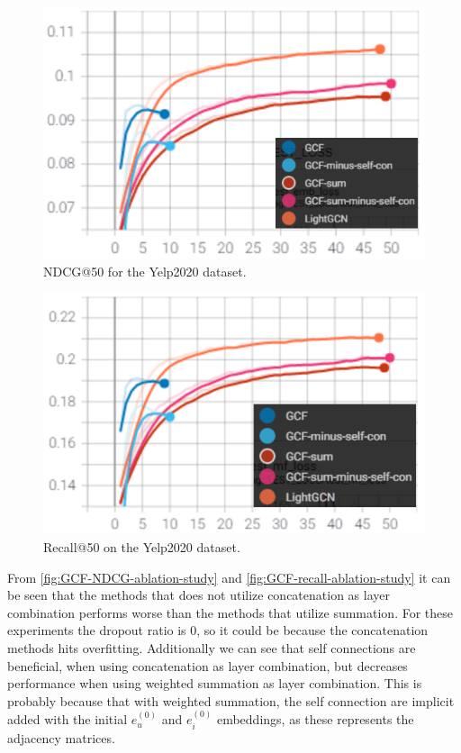 \begin{figure}[h!]
    \includegraphics[width=\linewidth]{figures/GCF-NDCG-Yelp-ablation.png}
    \caption{NDCG@50 for the Yelp2020 dataset.}
    \label{fig:GCF-NDCG-ablation-study}
\end{figure}

\begin{figure}[h!]
    \includegraphics[width=\linewidth]{figures/GCF-recall-Yelp-ablation.png}
    \caption{Recall@50 on the Yelp2020 dataset.}
    \label{fig:GCF-recall-ablation-study}
\end{figure}
From \autoref{fig:GCF-NDCG-ablation-study} and \autoref{fig:GCF-recall-ablation-study} it can be seen that the methods that does not utilize concatenation as layer combination performs worse than the methods that utilize summation.
For these experiments the dropout ratio is 0, so it could be because the concatenation methods hits overfitting.
Additionally we can see that self connections are beneficial, when using concatenation as layer combination, but decreases performance when using weighted summation as layer combination.
This is probably because that with weighted summation, the self connection are implicit added with the initial $e_u^{(0)}$ and $e_i^{(0)}$ embeddings, as these represents the adjacency matrices.